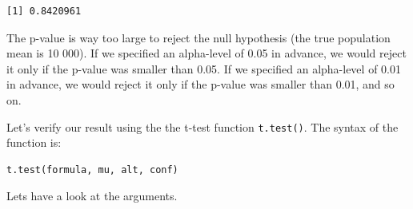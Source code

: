 \documentclass[]{article}
\theoremstyle{definition}
\theoremstyle{definition}
\theoremstyle{definition}
\theoremstyle{remark}
\begin{document}
\begin{verbatim}
[1] 0.8420961
\end{verbatim}

The p-value is way too large to reject the null hypothesis (the true
population mean is 10 000). If we specified an alpha-level of 0.05 in
advance, we would reject it only if the p-value was smaller than 0.05.
If we specified an alpha-level of 0.01 in advance, we would reject it
only if the p-value was smaller than 0.01, and so on.

Let's verify our result using the the t-test function \texttt{t.test()}.
The syntax of the function is:

\begin{verbatim}
t.test(formula, mu, alt, conf)
\end{verbatim}

Lets have a look at the arguments.
\end{document}
